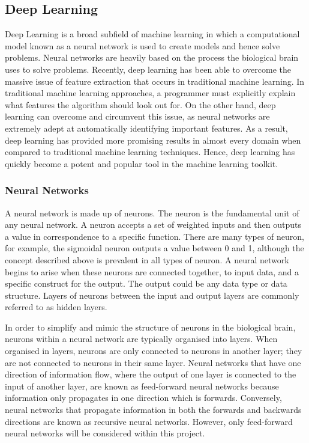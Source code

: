 \documentclass{l4proj}
\begin{document}
\subsection{Deep Learning}
Deep Learning is a broad subfield of machine learning in which a computational model known as a neural network is used to create models and hence solve problems.
Neural networks are heavily based on the process the biological brain uses to solve problems. 
Recently, deep learning has been able to overcome the massive issue of feature extraction that occurs in traditional machine learning.
In traditional machine learning approaches, a programmer must explicitly explain what features the algorithm should look out for.
On the other hand, deep learning can overcome and circumvent this issue, as neural networks are extremely adept at automatically identifying important features.
As a result, deep learning has provided more promising results in almost every domain when compared to traditional machine learning techniques.
Hence, deep learning has quickly become a potent and popular tool in the machine learning toolkit.

\subsubsection{Neural Networks}
A neural network is made up of neurons.
The neuron is the fundamental unit of any neural network.
A neuron accepts a set of weighted inputs and then outputs a value in correspondence to a specific function.
There are many types of neuron, for example, the sigmoidal neuron outputs a value between 0 and 1, although the concept described above is prevalent in all types of neuron.
A neural network begins to arise when these neurons are connected together, to input data, and a specific construct for the output.
The output could be any data type or data structure.
Layers of neurons between the input and output layers are commonly referred to as hidden layers.

In order to simplify and mimic the structure of neurons in the biological brain, neurons within a neural network are typically organised into layers.
When organised in layers, neurons are only connected to neurons in another layer; they are not connected to neurons in their same layer.
Neural networks that have one direction of information flow, where the output of one layer is connected to the input of another layer, are known as feed-forward neural networks because information only propagates in one direction which is forwards.
Conversely, neural networks that propagate information in both the forwards and backwards directions are known as recursive neural networks.
However, only feed-forward neural networks will be considered within this project.
\end{document}
